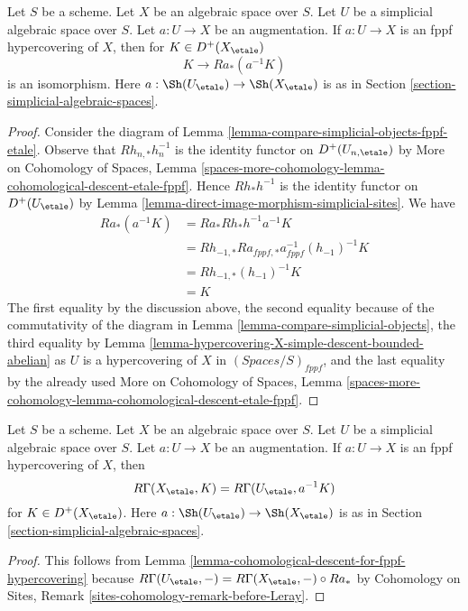\begin{lemma}
\label{lemma-cohomological-descent-for-fppf-hypercovering}
Let $S$ be a scheme. Let $X$ be an algebraic space over $S$.
Let $U$ be a simplicial algebraic space over $S$. Let $a : U \to X$
be an augmentation. If $a : U \to X$ is an fppf hypercovering of $X$,
then for $K \in D^+(X_\etale)$
$$
K \to Ra_*(a^{-1}K)
$$
is an isomorphism. Here $a : \Sh(U_\etale) \to \Sh(X_\etale)$
is as in Section \ref{section-simplicial-algebraic-spaces}.
\end{lemma}

\begin{proof}
Consider the diagram of Lemma \ref{lemma-compare-simplicial-objects-fppf-etale}.
Observe that $Rh_{n, *}h_n^{-1}$ is the identity functor
on $D^+(U_{n, \etale})$ by
More on Cohomology of Spaces, Lemma
\ref{spaces-more-cohomology-lemma-cohomological-descent-etale-fppf}.
Hence $Rh_*h^{-1}$ is the identity functor on
$D^+(U_\etale)$ by
Lemma \ref{lemma-direct-image-morphism-simplicial-sites}.
We have
\begin{align*}
Ra_*(a^{-1}K)
& =
Ra_*Rh_*h^{-1}a^{-1}K \\
& =
Rh_{-1, *}Ra_{fppf, *}a_{fppf}^{-1}(h_{-1})^{-1}K \\
& =
Rh_{-1, *}(h_{-1})^{-1}K \\
& =
K
\end{align*}
The first equality by the discussion above, the second equality
because of the commutativity of the diagram in
Lemma \ref{lemma-compare-simplicial-objects}, the third equality by
Lemma \ref{lemma-hypercovering-X-simple-descent-bounded-abelian}
as $U$ is a hypercovering of $X$ in $(\textit{Spaces}/S)_{fppf}$,
and the last equality by the already used
More on Cohomology of Spaces, Lemma
\ref{spaces-more-cohomology-lemma-cohomological-descent-etale-fppf}.
\end{proof}

\begin{lemma}
\label{lemma-compute-via-fppf-hypercovering}
Let $S$ be a scheme. Let $X$ be an algebraic space over $S$.
Let $U$ be a simplicial algebraic space over $S$. Let $a : U \to X$
be an augmentation. If $a : U \to X$ is an fppf hypercovering of $X$, then
$$
R\Gamma(X_\etale, K) = R\Gamma(U_\etale, a^{-1}K)
$$
for $K \in D^+(X_\etale)$. Here $a : \Sh(U_\etale) \to \Sh(X_\etale)$
is as in Section \ref{section-simplicial-algebraic-spaces}.
\end{lemma}

\begin{proof}
This follows from
Lemma \ref{lemma-cohomological-descent-for-fppf-hypercovering}
because $R\Gamma(U_\etale, -) = R\Gamma(X_\etale, -) \circ Ra_*$ by
Cohomology on Sites, Remark \ref{sites-cohomology-remark-before-Leray}.
\end{proof}

